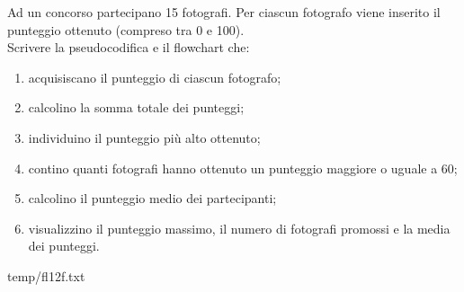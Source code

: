 \documentclass[11pt,fleqn]{book}
\begin{document}
\begin{esercizio}[2]
    Ad un concorso partecipano 15 fotografi. Per ciascun fotografo viene inserito il punteggio ottenuto (compreso tra 0 e 100). \\
    Scrivere la pseudocodifica e il flowchart che: 
    \begin{enumerate}  [labelsep=0.3cm]
        \item acquisiscano il punteggio di ciascun fotografo; 
        \item calcolino la somma totale dei punteggi; 
        \item individuino il punteggio più alto ottenuto; 
        \item contino quanti fotografi hanno ottenuto un punteggio maggiore o uguale a 60; 
        \item calcolino il punteggio medio dei partecipanti; 
        \item visualizzino il punteggio massimo, il numero di fotografi promossi e la media dei punteggi. 
    \end{enumerate}
    \ifsoluzioni
        \solution

        \begin{filecontents*}{temp/fl12f.txt}
        
        \end{filecontents*}

        \immediate{}
        
        \newpage

        \immediate{}
        
        \newpage
    \fi
\end{esercizio}


\newpage

% 




\end{document}
